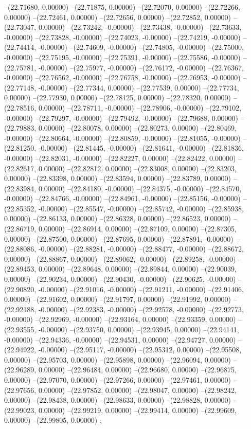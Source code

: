 --(22.71680, 0.00000)
--(22.71875, 0.00000)
--(22.72070, 0.00000)
--(22.72266, 0.00000)
--(22.72461, 0.00000)
--(22.72656, 0.00000)
--(22.72852, 0.00000)
--(22.73047, 0.00000)
--(22.73242, -0.00000)
--(22.73438, -0.00000)
--(22.73633, -0.00000)
--(22.73828, -0.00000)
--(22.74023, -0.00000)
--(22.74219, -0.00000)
--(22.74414, -0.00000)
--(22.74609, -0.00000)
--(22.74805, -0.00000)
--(22.75000, -0.00000)
--(22.75195, -0.00000)
--(22.75391, -0.00000)
--(22.75586, -0.00000)
--(22.75781, -0.00000)
--(22.75977, -0.00000)
--(22.76172, -0.00000)
--(22.76367, -0.00000)
--(22.76562, -0.00000)
--(22.76758, -0.00000)
--(22.76953, -0.00000)
--(22.77148, -0.00000)
--(22.77344, 0.00000)
--(22.77539, 0.00000)
--(22.77734, 0.00000)
--(22.77930, 0.00000)
--(22.78125, 0.00000)
--(22.78320, 0.00000)
--(22.78516, 0.00000)
--(22.78711, -0.00000)
--(22.78906, -0.00000)
--(22.79102, -0.00000)
--(22.79297, -0.00000)
--(22.79492, -0.00000)
--(22.79688, 0.00000)
--(22.79883, 0.00000)
--(22.80078, 0.00000)
--(22.80273, 0.00000)
--(22.80469, -0.00000)
--(22.80664, -0.00000)
--(22.80859, -0.00000)
--(22.81055, -0.00000)
--(22.81250, -0.00000)
--(22.81445, -0.00000)
--(22.81641, -0.00000)
--(22.81836, -0.00000)
--(22.82031, -0.00000)
--(22.82227, 0.00000)
--(22.82422, 0.00000)
--(22.82617, 0.00000)
--(22.82812, 0.00000)
--(22.83008, 0.00000)
--(22.83203, 0.00000)
--(22.83398, 0.00000)
--(22.83594, 0.00000)
--(22.83789, 0.00000)
--(22.83984, 0.00000)
--(22.84180, -0.00000)
--(22.84375, -0.00000)
--(22.84570, -0.00000)
--(22.84766, -0.00000)
--(22.84961, -0.00000)
--(22.85156, -0.00000)
--(22.85352, -0.00000)
--(22.85547, -0.00000)
--(22.85742, -0.00000)
--(22.85938, 0.00000)
--(22.86133, 0.00000)
--(22.86328, 0.00000)
--(22.86523, 0.00000)
--(22.86719, 0.00000)
--(22.86914, 0.00000)
--(22.87109, 0.00000)
--(22.87305, 0.00000)
--(22.87500, 0.00000)
--(22.87695, 0.00000)
--(22.87891, -0.00000)
--(22.88086, -0.00000)
--(22.88281, -0.00000)
--(22.88477, -0.00000)
--(22.88672, 0.00000)
--(22.88867, 0.00000)
--(22.89062, -0.00000)
--(22.89258, -0.00000)
--(22.89453, 0.00000)
--(22.89648, 0.00000)
--(22.89844, 0.00000)
--(22.90039, 0.00000)
--(22.90234, 0.00000)
--(22.90430, -0.00000)
--(22.90625, -0.00000)
--(22.90820, -0.00000)
--(22.91016, -0.00000)
--(22.91211, -0.00000)
--(22.91406, 0.00000)
--(22.91602, 0.00000)
--(22.91797, 0.00000)
--(22.91992, 0.00000)
--(22.92188, -0.00000)
--(22.92383, -0.00000)
--(22.92578, -0.00000)
--(22.92773, -0.00000)
--(22.92969, -0.00000)
--(22.93164, 0.00000)
--(22.93359, 0.00000)
--(22.93555, -0.00000)
--(22.93750, 0.00000)
--(22.93945, 0.00000)
--(22.94141, -0.00000)
--(22.94336, -0.00000)
--(22.94531, 0.00000)
--(22.94727, 0.00000)
--(22.94922, -0.00000)
--(22.95117, -0.00000)
--(22.95312, 0.00000)
--(22.95508, 0.00000)
--(22.95703, 0.00000)
--(22.95898, 0.00000)
--(22.96094, 0.00000)
--(22.96289, 0.00000)
--(22.96484, 0.00000)
--(22.96680, 0.00000)
--(22.96875, 0.00000)
--(22.97070, 0.00000)
--(22.97266, 0.00000)
--(22.97461, 0.00000)
--(22.97656, 0.00000)
--(22.97852, 0.00000)
--(22.98047, 0.00000)
--(22.98242, 0.00000)
--(22.98438, 0.00000)
--(22.98633, 0.00000)
--(22.98828, 0.00000)
--(22.99023, 0.00000)
--(22.99219, 0.00000)
--(22.99414, 0.00000)
--(22.99609, 0.00000)
--(22.99805, 0.00000)
;
